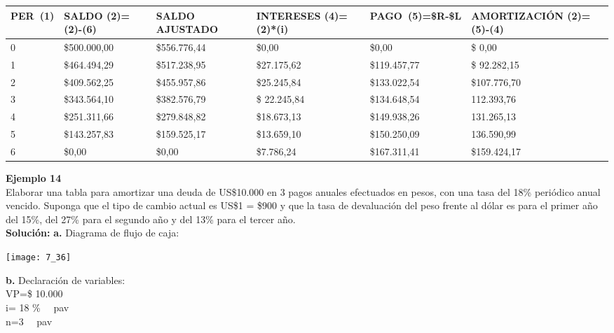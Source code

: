 \begin{spacing}{1.1}
    \begin{center}
        \begin{tabular}{|p{1cm}|p{2cm}|p{3cm}|p{2cm}|p{2cm}||p{3cm}|}
        \hline 
        \rowcolor{white!50}
 \textbf{PER\ (1)}  & \textbf{SALDO (2)=(2)-(6)}& \textbf{SALDO AJUSTADO } & \textbf{INTERESES  (4)=(2)*(i)}& \textbf{PAGO\ (5)=\$R-\$L }& \textbf{AMORTIZACIÓN  (2)=(5)-(4)} \\ \hline                                    

            0 & \$500.000,00 & \$556.776,44 & \$0,00 & \$0,00 & \$ 0,00\\ \hline 
            1 & \$464.494,29  &\$517.238,95  & \$27.175,62  & \$119.457,77 & \$ 92.282,15 \\ \hline
            2 & \$409.562,25  &\$455.957,86  & \$25.245,84  & \$133.022,54 &\$107.776,70 \\ \hline
            3 & \$343.564,10 & \$382.576,79 & \$ 22.245,84 & \$134.648,54  & 112.393,76\\ \hline 
            4 & \$251.311,66 & \$279.848,82 &  \$18.673,13 & \$149.938,26 & 131.265,13 \\ \hline 
            5 & \$143.257,83 & \$159.525,17 &  \$13.659,10 & \$150.250,09 & 136.590,99\\ \hline 
            6 & \$0,00 & \$0,00 & \$7.786,24 & \$167.311,41 & \$159.424,17 \\ \hline 
       

 
\end{tabular}
\end{center}
\end{spacing}
\textbf{Ejemplo 14}\\
Elaborar una tabla para amortizar una deuda de US\$10.000 en 3 pagos anuales efectuados en pesos, con una tasa del 18\% periódico anual vencido. Suponga que el tipo de cambio actual es US\$1 = \$900 y que la tasa de devaluación del peso frente al dólar es para el primer año del 15\%, del 27\% para el segundo año y del 13\% para el tercer año.\\

\textbf{Solución:}
\textbf{a.}	Diagrama de flujo de caja:
\begin{center}
	\texttt{[image: 7\_36]}
\end{center}
\textbf{b.	}Declaración de variables:\\


	VP=\$ 10.000\\
	i= 18 \% \ \ pav\\
	n=3 \ \ pav\\
	


